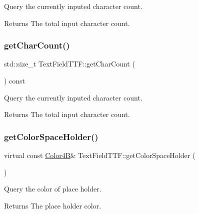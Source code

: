 Query the currently inputed character count. \begin{DoxyReturn}{Returns}
The total input character count. 
\end{DoxyReturn}
\mbox{\label{classTextFieldTTF_ac058c16dce279485b28c944583f924df}} 
\subsubsection{\texorpdfstring{get\+Char\+Count()}{getCharCount()}\hspace{0.1cm}{\footnotesize\ttfamily [2/2]}}
{\footnotesize\ttfamily std\+::size\+\_\+t Text\+Field\+T\+T\+F\+::get\+Char\+Count (\begin{DoxyParamCaption}{ }\end{DoxyParamCaption}) const\hspace{0.3cm}{\ttfamily [inline]}}

Query the currently inputed character count. \begin{DoxyReturn}{Returns}
The total input character count. 
\end{DoxyReturn}
\mbox{\label{classTextFieldTTF_afb471876e4d7949e6dbd39d33cd0076f}} 
\subsubsection{\texorpdfstring{get\+Color\+Space\+Holder()}{getColorSpaceHolder()}\hspace{0.1cm}{\footnotesize\ttfamily [1/2]}}
{\footnotesize\ttfamily virtual const \hyperlink{structColor4B}{Color4B}\& Text\+Field\+T\+T\+F\+::get\+Color\+Space\+Holder (\begin{DoxyParamCaption}{ }\end{DoxyParamCaption})\hspace{0.3cm}{\ttfamily [virtual]}}

Query the color of place holder. \begin{DoxyReturn}{Returns}
The place holder color. 
\end{DoxyReturn}
\mbox{\label{classTextFieldTTF_a066e3d650024862675c565b4a44843c6}} 
